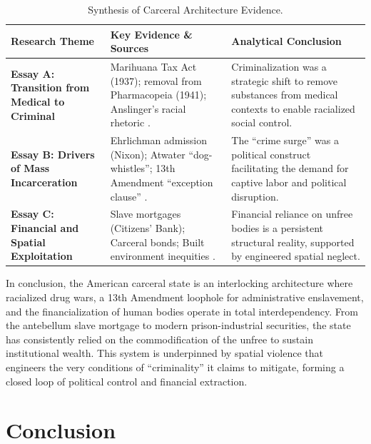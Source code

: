 \documentclass[12pt,openany]{book}
\begin{document}
\begin{table}[htbp]
\centering
\small
\renewcommand{\arraystretch}{1.5}
\begin{tabular}{>{\raggedright}p{3cm} >{\raggedright}p{5cm} >{\raggedright\arraybackslash}p{6cm}}
\toprule
\textbf{Research Theme} & \textbf{Key Evidence \& Sources} & \textbf{Analytical Conclusion} \\
\midrule
\textbf{Essay A: Transition from Medical to Criminal} & Marihuana Tax Act (1937); removal from Pharmacopeia (1941); Anslinger's racial rhetoric \cite{wikipedia_marijuana, degroote_centre}. & Criminalization was a strategic shift to remove substances from medical contexts to enable racialized social control. \\
\textbf{Essay B: Drivers of Mass Incarceration} & Ehrlichman admission (Nixon); Atwater ``dog-whistles''; 13th Amendment ``exception clause'' \cite{positive_health, princeton_legal, vera}. & The ``crime surge'' was a political construct facilitating the demand for captive labor and political disruption. \\
\textbf{Essay C: Financial and Spatial Exploitation} & Slave mortgages (Citizens' Bank); Carceral bonds; Built environment inequities \cite{murphy, princeton_legal, ncbi_bookshelf}. & Financial reliance on unfree bodies is a persistent structural reality, supported by engineered spatial neglect. \\
\bottomrule
\end{tabular}
\caption{Synthesis of Carceral Architecture Evidence.}
\label{tab:carceral_synthesis}
\end{table}

In conclusion, the American carceral state is an interlocking architecture where racialized drug wars, a 13th Amendment loophole for administrative enslavement, and the financialization of human bodies operate in total interdependency. From the antebellum slave mortgage to modern prison-industrial securities, the state has consistently relied on the commodification of the unfree to sustain institutional wealth. This system is underpinned by spatial violence that engineers the very conditions of ``criminality'' it claims to mitigate, forming a closed loop of political control and financial extraction.

\chapter{Conclusion}
\end{document}
